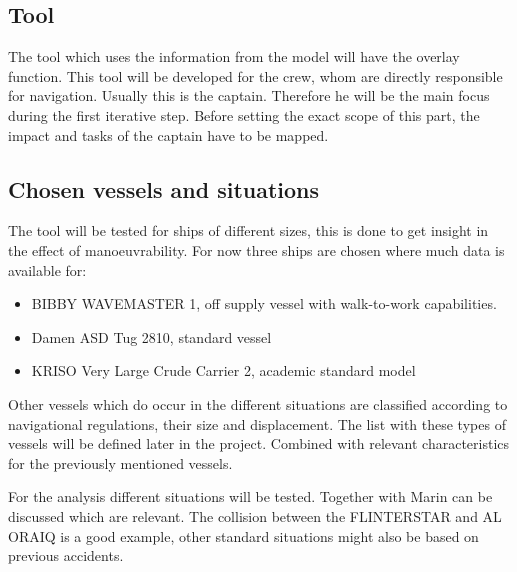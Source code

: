 \subsection{Tool}
The tool which uses the information from the model will have the overlay function. This tool will be developed for the crew, whom are directly responsible for navigation. Usually this is the captain. Therefore he will be the main focus during the first iterative step. Before setting the exact scope of this part, the impact and tasks of the captain have to be mapped.

\subsection{Chosen vessels and situations}
The tool will be tested for ships of different sizes, this is done to get insight in the effect of manoeuvrability. For now three ships are chosen where much data is available for:
\begin{itemize}
	\item BIBBY WAVEMASTER 1, off supply vessel with walk-to-work capabilities.
	\item Damen ASD Tug 2810, standard vessel
	\item KRISO Very Large Crude Carrier 2, academic standard model
\end{itemize}
Other vessels which do occur in the different situations are classified according to navigational regulations, their size and displacement. The list with these types of vessels will be defined later in the project. Combined with relevant characteristics for the previously mentioned vessels.

For the analysis different situations will be tested. Together with Marin can be discussed which are relevant. The collision between the FLINTERSTAR and AL ORAIQ is a good example, other standard situations might also be based on previous accidents.